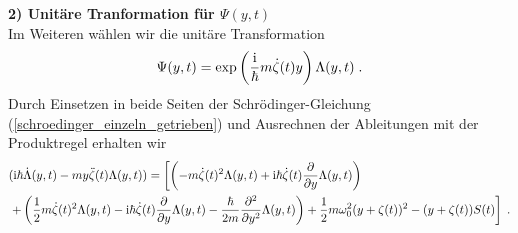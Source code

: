       \textbf{2) Unitäre Tranformation für $\Psi(y,t)$}\\
      Im Weiteren wählen wir die unitäre Transformation
      \begin{equation}
        \Psi(y,t) = \exp\left(\frac{\text i}{\hbar}m\dot \zeta(t) y\right)\Lambda(y,t) \; .
      \end{equation}
      Durch Einsetzen in beide Seiten der Schrödinger-Gleichung (\ref{schroedinger_einzeln_getrieben}) und Ausrechnen der Ableitungen mit der Produktregel erhalten wir
      \begin{align}
        \begin{split}
          &\iffalse\exp\left(\frac{\text i}{\hbar}m\dot \zeta(t) y\right)\fi(\text i \hbar \dot \Lambda(y,t) - my \ddot \zeta(t)\Lambda(y,t)) =
           \iffalse\exp\left(\frac{\text i}{\hbar}m\dot \zeta(t) y\right) \fi\left[\left(-m\dot \zeta(t)^2 \Lambda(y,t) + \text i \hbar \dot \zeta(t) \frac{\partial}{\partial y} \Lambda(y,t) \right) \right. \\
           &\left. + \left(\frac{1}{2}m\dot \zeta(t)^2 \Lambda(y,t) - \text{i} \hbar \dot \zeta(t) \frac{\partial}{\partial y} \Lambda(y,t) - \frac{\hbar}{2m}\frac{\partial^2}{\partial y^2} \Lambda(y,t)  \right)
          + \frac{1}{2}m\omega_0^2(y+\zeta(t))^2  - (y+\zeta(t))S(t)  \right] \; .
        \end{split}
      \end{align}
      \iffalse
      Durch Einsetzen in die Schrödinger-Gleichung und Ausrechnen der Ableitungen erhalten wir für die linke Seite von (\ref{schroedinger_einzeln_getrieben})
      \text e^{\frac{\text i}{\hbar}m\dot \zeta(t) y}(\text i \hbar \dot \Lambda(y,t) - my \ddot \zeta(t)\Lambda(y,t))
      \begin{equation}
      \end{equation}
      und für die rechte Seite
      \begin{align}
        \begin{split}
        \text e^{\frac{\text i}{\hbar}m\dot \zeta(t) y} \left[\left(-m\dot \zeta(t)^2 \Lambda(y,t) + \text i \hbar \dot \zeta(t) \frac{\partial}{\partial y} \Lambda(y,t) \right) + \left(\frac{1}{2}m\dot \zeta(t)^2 \Lambda(y,t) - \text{i} \hbar \dot \zeta(t) \frac{\partial}{\partial y} \Lambda(y,t) - \frac{\hbar}{2m}\frac{\partial^2}{\partial y^2} \Lambda(y,t)  \right) \right. \\
        \left. + \left(\frac{1}{2}m\omega_0^2y^2\Lambda(y,t) + m\omega_0^2y\zeta(t)\Lambda(y,t) + \frac{1}{2}m\omega_0^2 \zeta(t)^2\Lambda(y,t)) \right) + \left(-yS(t)\Lambda(y,t) - \zeta(t) S(t)\Lambda(y,t) \right) \right]
      \end{split}
      \end{align}
      \fi

